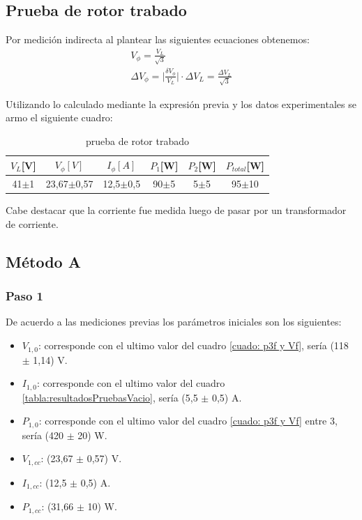 \documentclass[11pt,letterpaper]{article}     %
\begin{document}
\subsection{Prueba de rotor trabado}
Por medición indirecta al plantear las siguientes ecuaciones obtenemos:
\begin{eqnarray}
V_{\phi}=\frac{V_L}{\sqrt{3}}\\
\Delta V_{\phi}= \bigg|\frac{\delta V_{\phi}}{V_L}\bigg| \cdot \Delta V_L = \frac{\Delta V_L}{\sqrt{3}}
\end{eqnarray}

Utilizando lo calculado mediante la expresión previa y 
los datos experimentales se armo el siguiente cuadro:
\begin{table}[H]
	\centering
	\label{rotorTrabado}
	\caption{prueba de rotor trabado}
	\begin{tabular}{|c|c|c|c|c|c|}
		\hline
		$V_L$[V]&$V_{\phi}[V]$& $I_{\phi}[A]$ & $P_1$[W]&$P_2$[W]&$P_{total}$[W]\\ \hline
		41$\pm$1& 23,67$\pm$0,57&12,5$\pm$0,5&90$\pm$5&5$\pm$5& 95$\pm$10\\ \hline
	\end{tabular}
\end{table}
Cabe destacar que la corriente fue medida luego de pasar por un transformador de corriente.
\subsection{Método A}
\subsubsection{Paso 1}
De acuerdo a las mediciones previas los parámetros iniciales son los siguientes:
\begin{itemize}
	\item $V_{1,0}$: corresponde con el ultimo valor del cuadro \ref{cuado: p3f y Vf}, sería (118 $\pm$ 1,14) V.
	\item $I_{1,0}$: corresponde con el ultimo valor del cuadro \ref{tabla:resultadosPruebasVacio}, sería (5,5 $\pm$ 0,5) A.
	\item $P_{1,0}$: corresponde con el ultimo valor del cuadro \ref{cuado: p3f y Vf} entre 3, sería (420 $\pm$ 20) W.
	\item $V_{1,cc}$:  (23,67 $\pm$ 0,57) V.
	\item $I_{1,cc}$: (12,5 $\pm$ 0,5) A.
	\item $P_{1,cc}$: (31,66 $\pm$ 10) W.
\end{itemize}
\end{document}
